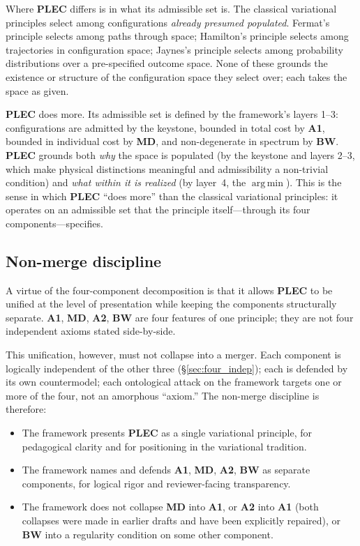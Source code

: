 \documentclass[11pt]{article}
\newcommand{\Aone}{\textbf{A1}}
\newcommand{\PLEC}{\textbf{PLEC}}
\newcommand{\argmin}{\mathop{\mathrm{arg\,min}}}
\begin{document}
Where \PLEC{} differs is in what its admissible set is. The classical variational principles select among configurations \emph{already presumed populated}. Fermat's principle selects among paths through space; Hamilton's principle selects among trajectories in configuration space; Jaynes's principle selects among probability distributions over a pre-specified outcome space. None of these grounds the existence or structure of the configuration space they select over; each takes the space as given.

\PLEC{} does more. Its admissible set is defined by the framework's layers 1--3: configurations are admitted by the keystone, bounded in total cost by \Aone{}, bounded in individual cost by \textbf{MD}, and non-degenerate in spectrum by \textbf{BW}. \PLEC{} grounds both \emph{why} the space is populated (by the keystone and layers 2--3, which make physical distinctions meaningful and admissibility a non-trivial condition) and \emph{what within it is realized} (by layer~4, the $\argmin$). This is the sense in which \PLEC{} ``does more'' than the classical variational principles: it operates on an admissible set that the principle itself---through its four components---specifies.

\subsection{Non-merge discipline}\label{sec:non_merge}

A virtue of the four-component decomposition is that it allows \PLEC{} to be unified at the level of presentation while keeping the components structurally separate. \Aone{}, \textbf{MD}, \textbf{A2}, \textbf{BW} are four features of one principle; they are not four independent axioms stated side-by-side.

This unification, however, must not collapse into a merger. Each component is logically independent of the other three (\S\ref{sec:four_indep}); each is defended by its own countermodel; each ontological attack on the framework targets one or more of the four, not an amorphous ``axiom.'' The non-merge discipline is therefore:

\begin{itemize}
    \item The framework presents \PLEC{} as a single variational principle, for pedagogical clarity and for positioning in the variational tradition.
    \item The framework names and defends \Aone{}, \textbf{MD}, \textbf{A2}, \textbf{BW} as separate components, for logical rigor and reviewer-facing transparency.
    \item The framework does not collapse \textbf{MD} into \Aone{}, or \textbf{A2} into \Aone{} (both collapses were made in earlier drafts and have been explicitly repaired), or \textbf{BW} into a regularity condition on some other component.
\end{itemize}
\end{document}

